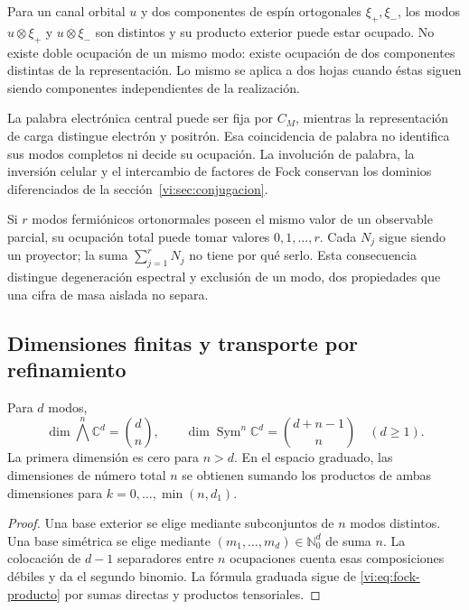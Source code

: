 Para un canal orbital \(u\) y dos componentes de espín
ortogonales \(\xi_+,\xi_-\), los modos
\(u\otimes\xi_+\) y \(u\otimes\xi_-\) son distintos y su
producto exterior puede estar ocupado. No existe doble ocupación
de un mismo modo: existe ocupación de dos componentes distintas
de la representación. Lo mismo se aplica a dos hojas cuando éstas
siguen siendo componentes independientes de la realización.

La palabra electrónica central puede ser fija por \(C_M\), mientras
la representación de carga distingue electrón y positrón. Esa
coincidencia de palabra no identifica sus modos completos ni
decide su ocupación. La involución de palabra, la inversión
celular y el intercambio de factores de Fock conservan los
dominios diferenciados de la sección~\ref{vi:sec:conjugacion}.

Si \(r\) modos fermiónicos ortonormales poseen el mismo valor
de un observable parcial, su ocupación total puede tomar valores
\(0,1,\ldots,r\). Cada \(N_j\) sigue siendo un proyector;
la suma \(\sum_{j=1}^rN_j\) no tiene por qué serlo. Esta
consecuencia distingue degeneración espectral y exclusión de
un modo, dos propiedades que una cifra de masa aislada no separa.

\subsection{Dimensiones finitas y transporte por refinamiento}
\label{vi:subsec:fock-refinamiento}

\begin{proposition}
\label{vi:prop:censo-fock}
Para \(d\) modos,
\[
 \dim\bigwedge^n\mathbb C^d=\binom dn,
 \qquad
 \dim\operatorname{Sym}^n\mathbb C^d=\binom{d+n-1}{n}
 \quad(d\ge1).
\]
La primera dimensión es cero para \(n>d\). En el espacio
graduado, las dimensiones de número total \(n\) se obtienen
sumando los productos de ambas dimensiones para
\(k=0,\ldots,\min(n,d_1)\).
\end{proposition}
\begin{proof}
Una base exterior se elige mediante subconjuntos de \(n\) modos
distintos. Una base simétrica se elige mediante
\((m_1,\ldots,m_d)\in\mathbb N_0^d\) de suma \(n\).
La colocación de \(d-1\) separadores entre \(n\) ocupaciones
cuenta esas composiciones débiles y da el segundo binomio.
La fórmula graduada sigue de \eqref{vi:eq:fock-producto} por
sumas directas y productos tensoriales.
\end{proof}

